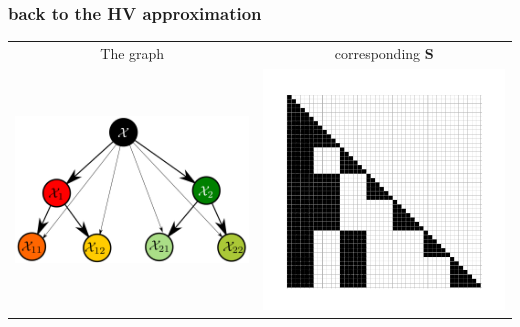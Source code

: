 \documentclass[usenames,dvipsnames,svgnames,table]{beamer}
\newcommand{\bS}{\mathbf{S}}
\begin{document}
\begin{frame}
	\frametitle{back to the HV approximation}
	
	\begin{tabular}{cc}
	The graph & corresponding $\bS$ \\
	\includegraphics[scale=0.2]{images/graph.pdf} & \includegraphics[scale=0.3]{images/S.pdf} 
	\end{tabular}
	
\end{frame}
\end{document}
